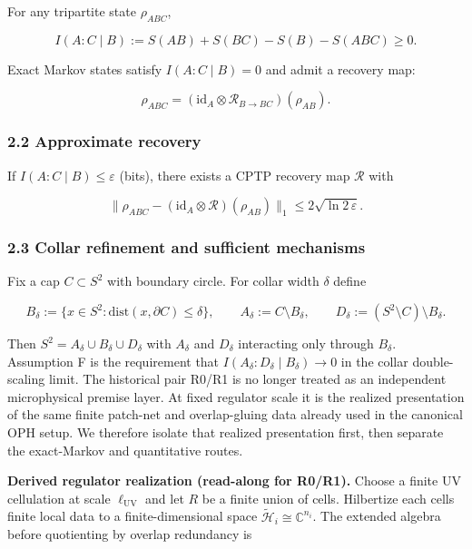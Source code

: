 For any tripartite state \(\rho_{ABC}\),

\[
I(A:C \mid B) := S(AB) + S(BC) - S(B) - S(ABC) \ge 0.
\]

Exact Markov states satisfy \(I(A:C \mid B) = 0\) and admit a recovery map:

\[
\rho_{ABC} = (\mathrm{id}_A \otimes \mathcal R_{B\to BC})(\rho_{AB}).
\]

\subsubsection{2.2 Approximate recovery}\label{22-approximate-recovery}

If \(I(A:C \mid B) \le \varepsilon\) (bits), there exists a CPTP recovery map \(\mathcal{R}\) with

\[
\| \rho_{ABC} - (\mathrm{id}_A \otimes \mathcal R)(\rho_{AB}) \|_1
\le 2 \sqrt{\ln 2\, \varepsilon}.
\]

\subsubsection{2.3 Collar refinement and sufficient mechanisms}\label{23-collar-refinement-and-sufficient-mechanisms}

Fix a cap \(C \subset S^2\) with boundary circle. For collar width \(\delta\) define

\[
B_\delta := \{x \in S^2 : \mathrm{dist}(x,\partial C) \le \delta\},
\qquad
A_\delta := C \setminus B_\delta,
\qquad
D_\delta := (S^2 \setminus C) \setminus B_\delta.
\]

Then \(S^2 = A_\delta \cup B_\delta \cup D_\delta\) with \(A_\delta\) and \(D_\delta\) interacting only through \(B_\delta\). Assumption F is the requirement that \(I(A_\delta:D_\delta \mid B_\delta) \to 0\) in the collar double-scaling limit. The historical pair R0/R1 is no longer treated as an independent microphysical premise layer. At fixed regulator scale it is the realized presentation of the same finite patch-net and overlap-gluing data already used in the canonical OPH setup. We therefore isolate that realized presentation first, then separate the exact-Markov and quantitative routes.

\textbf{Derived regulator realization (read-along for R0/R1).} Choose a finite UV cellulation at scale \(\ell_{\mathrm{UV}}\) and let \(R\) be a finite union of cells. Hilbertize each cell\textquotesingle s finite local data to a finite-dimensional space \(\tilde{\mathcal H}_i\cong \mathbb C^{n_i}\). The extended algebra before quotienting by overlap redundancy is


